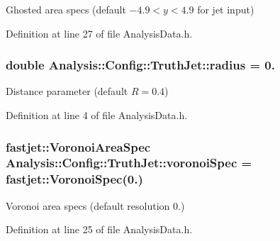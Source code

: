 Ghosted area specs (default $ -4.9 < y < 4.9 $ for jet input) 



Definition at line 27 of file Analysis\+Data.\+h.

\subsubsection[{\texorpdfstring{radius}{radius}}]{\setlength{\rightskip}{0pt plus 5cm}double Analysis\+::\+Config\+::\+Truth\+Jet\+::radius = 0.\hspace{0.3cm}{\ttfamily [static]}}\hypertarget{namespaceAnalysis_1_1Config_1_1TruthJet_a6a947195217aef2c4d4c6360017bab95}{}\label{namespaceAnalysis_1_1Config_1_1TruthJet_a6a947195217aef2c4d4c6360017bab95}


Distance parameter (default $ R = 0.4 $) 



Definition at line 4 of file Analysis\+Data.\+h.

\subsubsection[{\texorpdfstring{voronoi\+Spec}{voronoiSpec}}]{\setlength{\rightskip}{0pt plus 5cm}fastjet\+::\+Voronoi\+Area\+Spec Analysis\+::\+Config\+::\+Truth\+Jet\+::voronoi\+Spec = fastjet\+::\+Voronoi\+Spec(0.)\hspace{0.3cm}{\ttfamily [static]}}\hypertarget{namespaceAnalysis_1_1Config_1_1TruthJet_aacd5481a0b6ada44cb0c879204391075}{}\label{namespaceAnalysis_1_1Config_1_1TruthJet_aacd5481a0b6ada44cb0c879204391075}


Voronoi area specs (default resolution 0.) 



Definition at line 25 of file Analysis\+Data.\+h.

